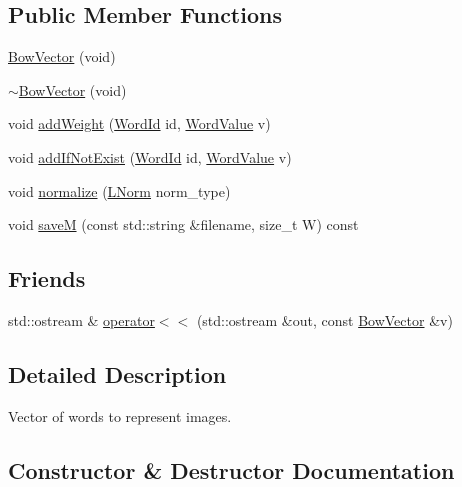 \subsection*{Public Member Functions}
\begin{DoxyCompactItemize}
\item 
\hyperlink{classDBoW2_1_1BowVector_ac4da23e700adc4ee083d66b23ce86e90}{Bow\+Vector} (void)
\item 
\hyperlink{classDBoW2_1_1BowVector_a7210cac6ce006c7232f4d097faa338d0}{$\sim$\+Bow\+Vector} (void)
\item 
void \hyperlink{classDBoW2_1_1BowVector_a3ac92a805b252c93dc6535240d02df47}{add\+Weight} (\hyperlink{namespaceDBoW2_ab1a0d3283b2d4690a383372ed20bfeb5}{Word\+Id} id, \hyperlink{namespaceDBoW2_a55fcd7333e591a38e96b91f41bc182f6}{Word\+Value} v)
\item 
void \hyperlink{classDBoW2_1_1BowVector_a5ddf10e444d10425e5bd3568dc7ffe5e}{add\+If\+Not\+Exist} (\hyperlink{namespaceDBoW2_ab1a0d3283b2d4690a383372ed20bfeb5}{Word\+Id} id, \hyperlink{namespaceDBoW2_a55fcd7333e591a38e96b91f41bc182f6}{Word\+Value} v)
\item 
void \hyperlink{classDBoW2_1_1BowVector_acd2dd34023e3053a4cc75d70c8b6ac13}{normalize} (\hyperlink{namespaceDBoW2_a53e9e0bcfc25c861815e413a7cf3fa51}{L\+Norm} norm\+\_\+type)
\item 
void \hyperlink{classDBoW2_1_1BowVector_a0611e948f987574161c121231341537b}{saveM} (const std\+::string \&filename, size\+\_\+t W) const
\end{DoxyCompactItemize}
\subsection*{Friends}
\begin{DoxyCompactItemize}
\item 
std\+::ostream \& \hyperlink{classDBoW2_1_1BowVector_a1a7d9ac0f9128538859adfea38453ae1}{operator$<$$<$} (std\+::ostream \&out, const \hyperlink{classDBoW2_1_1BowVector}{Bow\+Vector} \&v)
\end{DoxyCompactItemize}


\subsection{Detailed Description}
Vector of words to represent images. 

\subsection{Constructor \& Destructor Documentation}
\mbox{\label{classDBoW2_1_1BowVector_ac4da23e700adc4ee083d66b23ce86e90}} 
